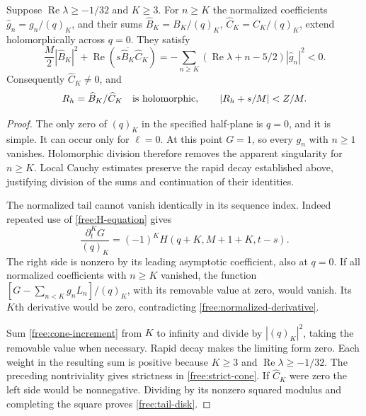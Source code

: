 \begin{lemma}\label{free:cone}
Suppose $\operatorname{Re}\lambda\ge-1/32$ and $K\ge3$.  For $n\ge K$
the normalized coefficients $\widehat g_n=g_n/(q)_K$, and their sums
$\widehat B_K=B_K/(q)_K$, $\widehat C_K=C_K/(q)_K$, extend
holomorphically across $q=0$.  They satisfy
\begin{equation}\label{free:strict-cone}
 \frac M2|\widehat B_K|^2+
 \operatorname{Re}(s\overline{\widehat B_K}\widehat C_K)
 =-\sum_{n\ge K}(\operatorname{Re}\lambda+n-5/2)
 |\widehat g_n|^2<0.
\end{equation}
Consequently $\widehat C_K\ne0$, and
\begin{equation}\label{free:tail-disk}
 R_h=\widehat B_K/\widehat C_K\quad\hbox{is holomorphic},\qquad
 |R_h+s/M|<Z/M.
\end{equation}
\end{lemma}

\begin{proof}
The only zero of $(q)_K$ in the specified half-plane is $q=0$, and it is
simple.  It can occur only for $\ell=0$.  At this point $G=1$, so every
$g_n$ with $n\ge1$ vanishes.  Holomorphic division therefore removes
the apparent singularity for $n\ge K$.  Local Cauchy estimates preserve
the rapid decay established above, justifying division of the sums and
continuation of their identities.

The normalized tail cannot vanish identically in its sequence index.
Indeed repeated use of \eqref{free:H-equation} gives
\begin{equation}\label{free:normalized-derivative}
 \frac{\partial_t^K G}{(q)_K}
 =(-1)^KH(q+K,M+1+K,t-s).
\end{equation}
The right side is nonzero by its leading asymptotic coefficient, also at
$q=0$.  If all normalized coefficients with $n\ge K$ vanished, the
function $[G-\sum_{n<K}g_nL_n]/(q)_K$, with its removable value at zero,
would vanish.  Its $K$th derivative would be zero, contradicting
\eqref{free:normalized-derivative}.

Sum \eqref{free:cone-increment} from $K$ to infinity and divide by
$|(q)_K|^2$, taking the removable value when necessary.  Rapid decay
makes the limiting form zero.  Each weight in the resulting sum is
positive because $K\ge3$ and $\operatorname{Re}\lambda\ge-1/32$.
The preceding nontriviality gives strictness in
\eqref{free:strict-cone}.  If $\widehat C_K$ were zero the left side
would be nonnegative.  Dividing by its nonzero squared modulus and
completing the square proves \eqref{free:tail-disk}.
\end{proof}

